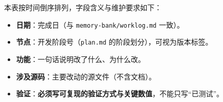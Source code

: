 
本表按时间倒序排列，字段含义与维护要求如下：

\begin{itemize}\itemsep2pt
  \item \textbf{日期}：完成日（与 \texttt{memory-bank/worklog.md} 一致）。
  \item \textbf{节点}：开发阶段号（\texttt{plan.md} 的阶段划分），可视为版本标签。
  \item \textbf{功能}：一句话说明改了什么、为什么改。
  \item \textbf{涉及源码}：主要改动的源文件（不含文档）。
  \item \textbf{验证}：{\bfseries 必须写可复现的验证方式与关键数值}，不能只写``已测试''。
\end{itemize}

